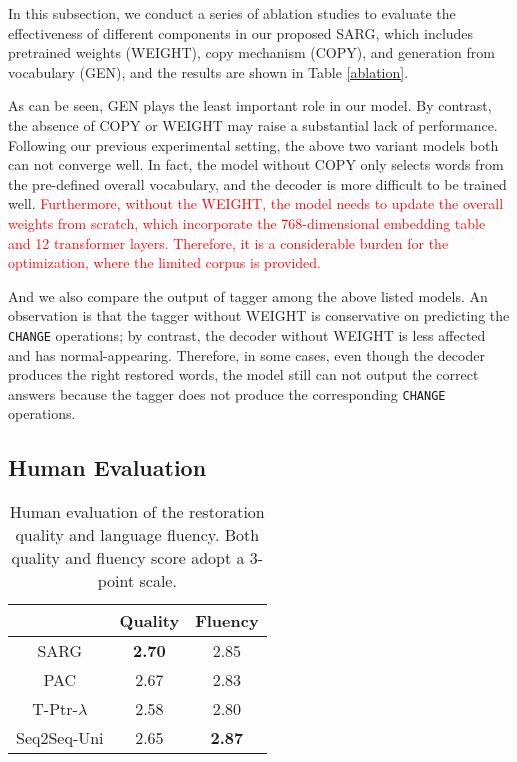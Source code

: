 In this subsection, we conduct a series of ablation studies to evaluate the effectiveness of different components in our proposed SARG, which includes pretrained weights (WEIGHT), copy mechanism (COPY), and generation from vocabulary (GEN), and the results are shown in Table \ref{ablation}. 

As can be seen, GEN plays the least important role in our model. By contrast, the absence of COPY or WEIGHT may raise a substantial lack of performance. Following our previous experimental setting, the above two variant models both can not converge well. In fact, the model without COPY only selects words from the pre-defined overall vocabulary, and the decoder is more difficult to be trained well. \textcolor{red}{Furthermore, without the WEIGHT, the model needs to update the overall weights from scratch, which incorporate the 768-dimensional embedding table and 12 transformer layers. Therefore, it is a considerable burden for the optimization, where the limited corpus is provided.} 

And we also compare the output of tagger among the above listed models. An observation is that the tagger without WEIGHT is conservative on predicting the \texttt{CHANGE} operations; by contrast, the decoder without WEIGHT is less affected and has normal-appearing. Therefore, in some cases, even though the decoder produces the right restored words, the model still can not output the correct answers because the tagger does not produce the corresponding \texttt{CHANGE} operations.


\subsection{Human Evaluation}


\begin{table}[!htb]
	\centering
	\begin{tabular}{|c|c|c|}
		\hline
		& Quality  & Fluency \\ \hline
		SARG & \textbf{2.70} & 2.85 \\ \hline
		PAC & 2.67 & 2.83 \\ \hline
		T-Ptr-$\lambda$& 2.58 & 2.80 \\ \hline
		Seq2Seq-Uni& 2.65 & \textbf{2.87} \\ \hline
	\end{tabular}
	\caption{Human evaluation of the restoration quality and language fluency. Both quality and fluency score adopt a 3-point scale.}\label{human}
\end{table}

